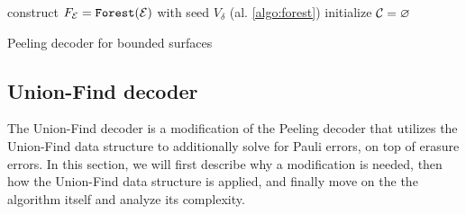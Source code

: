 \begin{algorithm}[h]
  \BlankLine
  \BlankLine
  construct $F_{\mathcal{E}} = \texttt{Forest}(\mathcal{E})$ with seed $V_\delta$ (al. \ref{algo:forest})\;
  initialize $\mathcal{C} = {\varnothing}$\;
  \BlankLine
  \caption{Peeling decoder for bounded surfaces \cite{delfosse2017linear}}\label{algo:peelbound}
\end{algorithm}






\subsection{Union-Find decoder}
The Union-Find decoder \cite{delfosse2017almost} is a modification of the Peeling decoder that utilizes the Union-Find data structure \cite{tarjan1975efficiency} to additionally solve for Pauli errors, on top of erasure errors. In this section, we will first describe why a modification is needed, then how the Union-Find data structure is applied, and finally move on the the algorithm itself and analyze its complexity.

